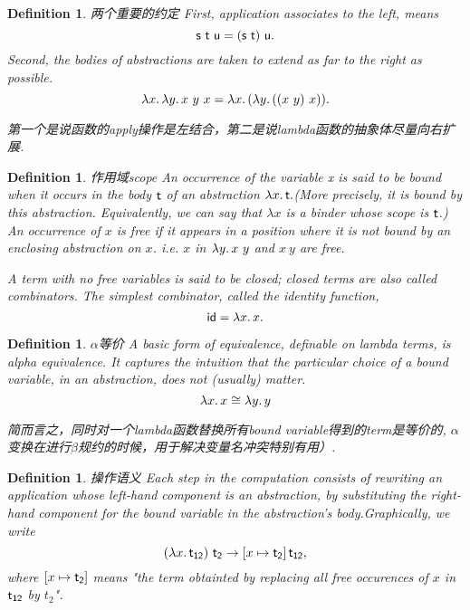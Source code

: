 \documentclass{article}
\theoremstyle{plain}
\newtheorem{definition}[theorem]{Definition}
\theoremstyle{nonumberplain}
\newcommand{\lam}[2]{\ensuremath{\lambda #1\ldotp #2}} %
\newcommand{\term}[1]{\ensuremath\mathsf{#1}}
\begin{document}
\begin{definition}
\rm {\color{red}两个重要的约定} First, application associates to the left, means
$$
\term{s}~\term{t}~\term{u} = (\term{s}~\term{t})~\term{u}.
$$
Second, the bodies of abstractions are taken to extend as far to the right
as possible.
$$
\lam{x}{\lam{y}{x~y~x}} = \lam{x}{(\lam{y}{((x~y)~x)})}.
$$

{\color{blue} 第一个是说函数的apply操作是左结合，第二是说lambda函数的抽象体尽量向右扩展}.
\end{definition}

\begin{definition}
\rm {\color{red} 作用域scope} An occurrence of the variable x is said to be {\color{red} bound} when it occurs in the body $\term{t}$ of an abstraction $\lam{x}{\term{t}}.$(More precisely, it is bound by this abstraction.
Equivalently, we can say that $\lambda x$ is a binder whose scope is $\term{t}$.) An occurrence of $x$ is {\color{red} free} if it appears in a position where it is not bound by an enclosing abstraction on $x$. i.e. $x$ in $\lam{y}{x\ y}$ and $x\ y$ are free. 

A term with no free variables is said to be {\color{red} closed}; closed terms are also called {\color{red}combinators}. The simplest combinator, called the identity function,
$$
\term{id} = \lam{x}{x}.
$$
\end{definition}

\begin{definition}
\rm {\color{red} $\alpha$等价} A basic form of equivalence, definable on lambda terms, is alpha equivalence. It captures the intuition that the particular choice of a bound variable, in an abstraction, does not (usually) matter. 
$$
\lam{x}{x} \cong \lam{y}{y}
$$

{\color{blue} 简而言之，同时对一个lambda函数替换所有bound variable得到的term是等价的, $\alpha$变换在进行$\beta$规约的时候，用于解决变量名冲突特别有用）}.
\end{definition}

\begin{definition}
\rm {\color{red} 操作语义} Each step in the computation consists of rewriting an application whose left-hand component is an abstraction, by substituting the right-hand component for the bound variable in the abstraction's body.Graphically, we write
$$
(\lam{x}{\term{t_{12}}})~\term{t_2} \rightarrow \left[ x \mapsto \term{t_2} \right] \term{t_{12}},
$$
where $\left[ x \mapsto \term{t_2} \right]$ means "the term obtainted by replacing all free occurences of $x$ in $\term{t_{12}}$ by $t_2$". 
\end{definition}
\end{document}
